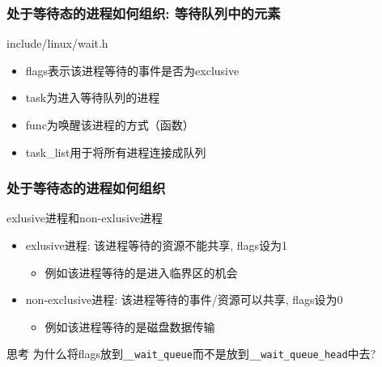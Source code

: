 \documentclass[xcolor=svgnames]{beamer}
\begin{document}
\begin{CJK*}{UTF8}{gbsn}
\begin{frame}[fragile]
\frametitle{处于等待态的进程如何组织: 等待队列中的元素}
\begin{block}{include/linux/wait.h}
\lstwaitqueue
\end{block}
\begin{itemize}
\item flags表示该进程等待的事件是否为exclusive
\item task为进入等待队列的进程
\item func为唤醒该进程的方式（函数）
\item task\_list用于将所有进程连接成队列
\end{itemize}
\end{frame}

\begin{frame}[fragile]
\frametitle{处于等待态的进程如何组织}
\begin{block}{exlusive进程和non-exlusive进程}
\begin{itemize}
\item exlusive进程: 该进程等待的资源不能共享, flags设为1
\begin{itemize}
\item 例如该进程等待的是进入临界区的机会
\end{itemize}
\item non-exclusive进程: 该进程等待的事件/资源可以共享, flags设为0
\begin{itemize}
\item 例如该进程等待的是磁盘数据传输
\end{itemize}
\end{itemize}
\end{block}
\begin{block}{思考}
为什么将flags放到\verb|__wait_queue|而不是放到\verb|__wait_queue_head|中去?
\end{block}
\end{frame}


\end{CJK*}
\end{document}
